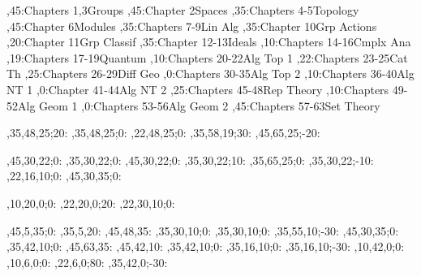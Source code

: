 
\setcounter{diagheight}{50}
\begin{chart}
,45:{Chapters 1,3}{Groups}{}
,45:{Chapter 2}{Spaces}{}
,35:{Chapters 4-5}{Topology}{}
,45:{Chapter 6}{Modules}{}
,35:{Chapters 7-9}{Lin Alg}{}
,35:{Chapter 10}{Grp Actions}{}
,20:{Chapter 11}{Grp Classif}{}
,35:{Chapter 12-13}{Ideals}{}
,10:{Chapters 14-16}{Cmplx Ana}{}
,19:{Chapters 17-19}{Quantum}{}
,10:{Chapters 20-22}{Alg Top 1}{}
,22:{Chapters 23-25}{Cat Th}{}
,25:{Chapters 26-29}{Diff Geo}{}
,0:{Chapters 30-35}{Alg Top 2}{}
,10:{Chapters 36-40}{Alg NT 1}{}
,0:{Chapter 41-44}{Alg NT 2}{}
,25:{Chapters 45-48}{Rep Theory}{}
,10:{Chapters 49-52}{Alg Geom 1}{}
,0:{Chapters 53-56}{Alg Geom 2}{}
,45:{Chapters 57-63}{Set Theory}{}

,35,48,25;20:  %
,35,48,25;0:   %
,22,48,25;0:   %
,35,58,19;30:  %
,45,65,25;-20: %

,45,30,22;0:   %
,35,30,22;0:   %
,45,30,22;0:   %
,35,30,22;10:  %
,35,65,25;0:   %
,35,30,22;-10: %
,22,16,10;0:   %
,45,30,35;0:   %

,10,20,0;0:    %
,22,20,0;20:   %
,22,30,10;0:   %

,45,5,35;0:    %
,35,5,20:      %
,45,48,35:     %
,35,30,10;0:   %
,35,30,10;0:   %
,35,55,10;-30: %
,45,30,35;0:   %
,35,42,10;0:   %
,45,63,35:     %
,45,42,10:     %
,35,42,10;0:   %
,35,16,10;0:   %
,35,16,10;-30: %
,10,42,0;0:    %
,10,6,0;0:     %
,22,6,0;80:     %
,35,42,0;-30:  %
\end{chart}
